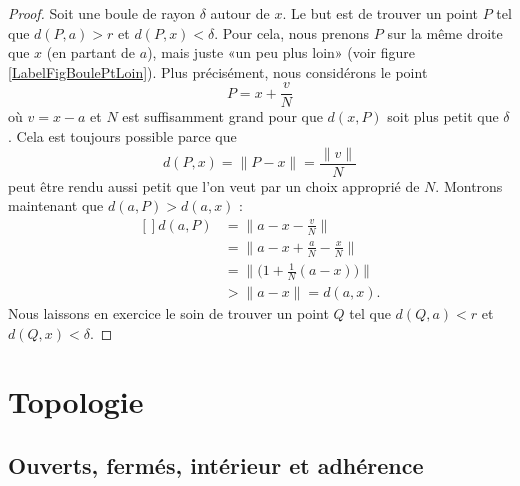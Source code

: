 \begin{proof}
	Soit une boule de rayon $\delta$ autour de $x$. Le but est de trouver un point $P$ tel que $d(P,a)>r$ et $d(P,x)<\delta$. Pour cela, nous prenons $P$ sur la même droite que $x$ (en partant de $a$), mais juste «un peu plus loin» (voir figure \ref{LabelFigBoulePtLoin}). Plus précisément, nous considérons le point
	\begin{equation}
		P=x+\frac{ v }{ N }
	\end{equation}
	où $v=x-a$ et $N$ est suffisamment grand pour que $d(x,P)$ soit plus petit que $\delta$. Cela est toujours possible parce que
	\begin{equation}
		d(P,x)=\| P-x \|=\frac{ \| v \| }{ N }
	\end{equation}
	peut être rendu aussi petit que l'on veut par un choix approprié de $N$. Montrons maintenant que $d(a,P)>d(a,x)$ :
	\begin{equation}
		\begin{aligned}[]
			d(a,P)&=\| a-x-\frac{ v }{ N }\| \\
			&=\| a-x+\frac{ a }{ N }-\frac{ x }{ N } \|\\
			&=\| \big( 1+\frac{1}{ N }(a-x) \big) \|\\
			&>\| a-x \|=d(a,x).
		\end{aligned}
	\end{equation}
	Nous laissons en exercice le soin de trouver un point $Q$ tel que $d(Q,a)<r$ et $d(Q,x)<\delta$.
\end{proof}




\section{Topologie}\label{Sect_topologie}

\subsection{Ouverts, fermés, intérieur et adhérence}


